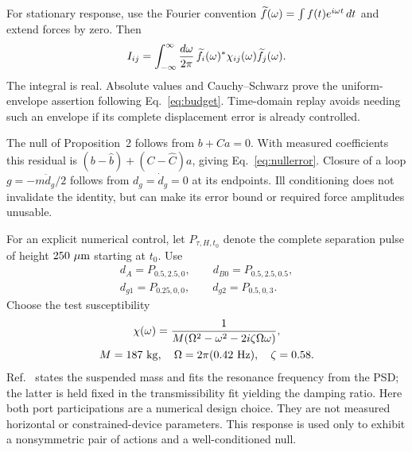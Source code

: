 For stationary response, use the Fourier convention $\widetilde{f}(\omega)=\int f(t)e^{i\omega t}\,dt$ and extend forces by zero. Then
\begin{equation}
I_{ij}=\int_{-\infty}^\infty\frac{d\omega}{2\pi}\,
\wt f_i(\omega)^*\chi_{ij}(\omega)\wt f_j(\omega).
\label{eq:fourieraction}
\end{equation}
The integral is real. Absolute values and Cauchy--Schwarz prove the uniform-envelope assertion following Eq.~\eqref{eq:budget}. Time-domain replay avoids needing such an envelope if its complete displacement error is already controlled.

The null of Proposition~2 follows from $b+Ca=0$. With measured coefficients this residual is $(b-\widehat b)+(C-\widehat C)a$, giving Eq.~\eqref{eq:nullerror}. Closure of a loop $g=-m\ddot d_g/2$ follows from $d_g=\dot d_g=0$ at its endpoints. Ill conditioning does not invalidate the identity, but can make its error bound or required force amplitudes unusable.

For an explicit numerical control, let $P_{\tau,H,t_0}$ denote the complete separation pulse of height $250\ \mu{\rm m}$ starting at $t_0$. Use
\begin{equation}
\begin{gathered}
d_A=P_{0.5,2.5,0},\qquad d_{B0}=P_{0.5,2.5,0.5},\\
d_{g1}=P_{0.25,0,0},\qquad d_{g2}=P_{0.5,0,3}.
\end{gathered}
\label{eq:nullpulses}
\end{equation}
Choose the test susceptibility
\begin{equation}
\begin{gathered}
\chi(\omega)=\frac1{M(\Omega^2-\omega^2-2i\zeta\Omega\omega)},\\
M=187\ {\rm kg},\quad\Omega=2\pi(0.42\ {\rm Hz}),\quad\zeta=0.58.
\end{gathered}
\label{eq:damped}
\end{equation}
Ref.~\cite{Hermsdorf} states the suspended mass and fits the resonance frequency from the PSD; the latter is held fixed in the transmissibility fit yielding the damping ratio. Here both port participations are a numerical design choice. They are not measured horizontal or constrained-device parameters. This response is used only to exhibit a nonsymmetric pair of actions and a well-conditioned null.

